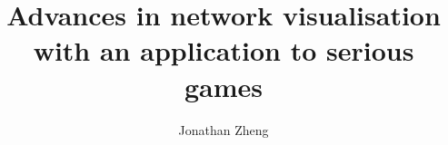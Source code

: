 \documentclass[a4paper,12pt,twoside]{report}
\begin{document}
\title{\LARGE {\bf Advances in network visualisation with an application to serious games}\\
 \vspace*{6mm}
}

\author{Jonathan Zheng}

\normallinespacing
\maketitle

\preface
% 
% 
% 
% 

\body
% 
% 

% 
% 


\printbibliography
\end{document}
